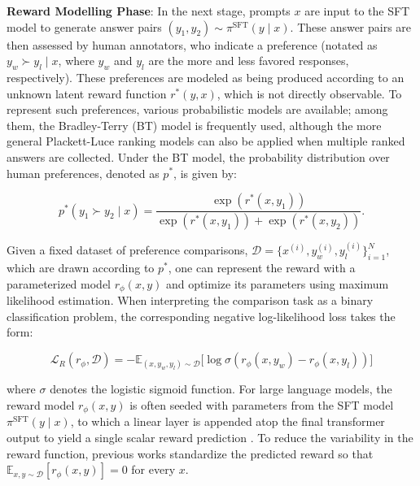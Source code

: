\textbf{Reward Modelling Phase}: In the next stage, prompts $x$ are input to the SFT model to generate answer pairs $(y_1, y_2)\sim \pi^\text{SFT}(y \mid x)$. These answer pairs are then assessed by human annotators, who indicate a preference (notated as $y_w\succ y_l \mid x$, where $y_w$ and $y_l$ are the more and less favored responses, respectively). These preferences are modeled as being produced according to an unknown latent reward function $r^*(y, x)$, which is not directly observable. To represent such preferences, various probabilistic models are available; among them, the Bradley-Terry (BT) \cite{bradley1952rankanalysis} model is frequently used, although the more general Plackett-Luce ranking models \citep{plackett1975analysis, luce2012individual} can also be applied when multiple ranked answers are collected. Under the BT model, the probability distribution over human preferences, denoted as $p^*$, is given by:

\begin{equation}\label{eq:bradley-terry}
    p^*(y_1\succ y_2 \mid x)=\frac{\exp\left(r^*(x, y_1)\right)}{\exp\left(r^*(x, y_1)\right) + \exp\left(r^*(x, y_2)\right)}.
\end{equation}

Given a fixed dataset of preference comparisons, $\mathcal{D}=\bigl\{x^{(i)}, y_w^{(i)}, y_l^{(i)}\bigr\}_{i=1}^N$, which are drawn according to $p^*$, one can represent the reward with a parameterized model $r_{\phi}(x, y)$ and optimize its parameters using maximum likelihood estimation. When interpreting the comparison task as a binary classification problem, the corresponding negative log-likelihood loss takes the form:

\begin{equation}\label{eq:reward_model}
    \mathcal{L}_R(r_{\phi}, \mathcal{D}) = -\mathbb{E}_{(x, y_w, y_l)\sim \mathcal{D}}\bigl[\log \sigma(r_{\phi}(x, y_w)- r_{\phi}(x, y_l))\bigr]
\end{equation}

where $\sigma$ denotes the logistic sigmoid function. For large language models, the reward model $r_{\phi}(x, y)$ is often seeded with parameters from the SFT model $\pi^\text{SFT}(y \mid x)$, to which a linear layer is appended atop the final transformer output to yield a single scalar reward prediction \cite{ziegler2020finetuning}. To reduce the variability in the reward function, previous works standardize the predicted reward so that $\mathbb{E}_{x,y\sim \mathcal{D}}\left[r_\phi(x, y)\right] = 0$ for every $x$.

